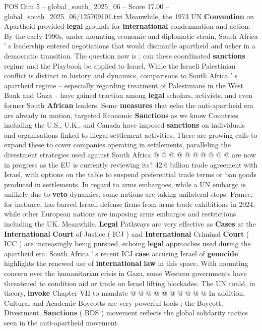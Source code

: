 \begin{textsample}{POS Dim 5 – global\_south\_2025\_06 – Score 17.00 – global\_south\_2025\_06/125709101.txt}
Meanwhile, the 1973 UN \textbf{Convention} on Apartheid provided \textbf{legal} grounds for \textbf{international} condemnation and action.
By the early 1990s, under mounting economic and diplomatic strain, South Africa ' s leadership entered negotiations that would dismantle apartheid and usher in a democratic transition.
The question now is ; can these coordinated \textbf{sanctions} regime and the Playbook be applied to Israel, While the Israeli Palestinian conflict is distinct in history and dynamics, comparisons to South Africa ' s apartheid regime -- especially regarding treatment of Palestinians in the West Bank and Gaza -- have gained traction among \textbf{legal} scholars, activists, and even former South \textbf{African} leaders.
Some \textbf{measures} that echo the anti-apartheid era are already in motion, targeted Economic \textbf{Sanctions} as we know Countries including the U.S., U.K., and Canada have imposed \textbf{sanctions} on individuals and organisations linked to illegal settlement activities.
There are growing calls to expand these to cover companies operating in settlements, paralleling the divestment strategies used against South Africa @ @ @ @ @ @ @ @ @ @ are now in progress as the EU is currently reviewing its? 42.6 billion trade agreement with Israel, with options on the table to suspend preferential trade terms or ban goods produced in settlements.
In regard to arms embargoes, while a UN embargo is unlikely due to \textbf{veto} dynamics, some nations are taking unilateral steps.
France, for instance, has barred Israeli defense firms from arms trade exhibitions in 2024, while other European nations are imposing arms embargos and restrictions including the UK.
Meanwhile, \textbf{Legal} Pathways are very effective as \textbf{Cases} at the \textbf{International} \textbf{Court} of Justice ( ICJ ) and \textbf{International} Criminal \textbf{Court} ( ICC ) are increasingly being pursued, echoing \textbf{legal} approaches used during the apartheid era.
South Africa ' s recent ICJ \textbf{case} accusing Israel of \textbf{genocide} highlights the renewed use of \textbf{international} \textbf{law} in this space.
With mounting concern over the humanitarian crisis in Gaza, some Western governments have threatened to condition aid or trade on Israel lifting blockades.
The UN could, in theory, \textbf{invoke} Chapter VII to mandate @ @ @ @ @ @ @ @ @ @ In addition, Cultural and Academic Boycotts are very powerful tools ; the Boycott, Divestment, \textbf{Sanctions} ( BDS ) movement reflects the global solidarity tactics seen in the anti-apartheid movement.

\end{textsample}
